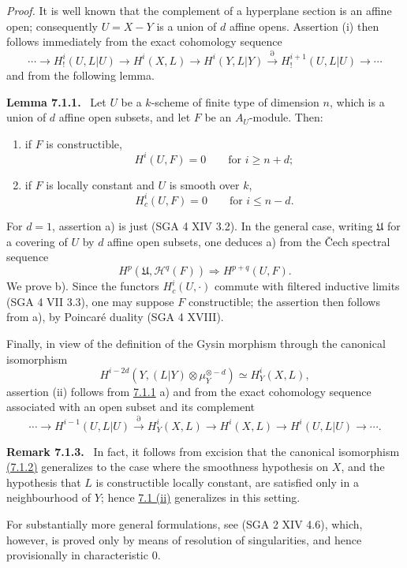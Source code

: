 \documentclass[11pt]{article}
\newenvironment{statement}[1]{\par\medskip\noindent\textbf{#1.}\ }{\par\medskip}
\begin{document}
\emph{Proof.} It is well known that the complement of a hyperplane section is an affine open; consequently $U=X-Y$ is a union of $d$ affine opens. Assertion (i) then follows immediately from the exact cohomology sequence
\[
\cdots\to H_!^i(U,L|U)\to H^i(X,L)\to H^i(Y,L|Y)
\xrightarrow{\partial} H_!^{i+1}(U,L|U)\to\cdots
\]
and from the following lemma.

\label{sga5:VII:lemma:7.1.1}\begin{statement}{Lemma 7.1.1}
Let $U$ be a $k$-scheme of finite type of dimension $n$, which is a union of $d$ affine open subsets, and let $F$ be an $A_U$-module. Then:
\begin{enumerate}[label=\alph*)]
\item if $F$ is constructible,
\[
H^i(U,F)=0\qquad\text{for }i\ge n+d;
\]
\item if $F$ is locally constant and $U$ is smooth over $k$,
\[
H^i_c(U,F)=0\qquad\text{for }i\le n-d.
\]
\end{enumerate}
\end{statement}

For $d=1$, assertion a) is just (SGA 4 XIV 3.2). In the general case, writing $\mathfrak U$ for a covering of $U$ by $d$ affine open subsets, one deduces a) from the Čech spectral sequence
\[
H^p(\mathfrak U,\mathcal H^q(F))\Rightarrow H^{p+q}(U,F).
\]
We prove b). Since the functors $H_c^i(U,\cdot)$ commute with filtered inductive limits (SGA 4 VII 3.3), one may suppose $F$ constructible; the assertion then follows from a), by Poincaré duality (SGA 4 XVIII).

Finally, in view of the definition of the Gysin morphism through the canonical isomorphism
\[
H^{i-2d}(Y,(L|Y)\otimes\mu_Y^{\otimes -d})\simeq H^i_Y(X,L),
\tag{7.1.2}\label{sga5:VII:equation:7.1.2}
\]
assertion (ii) follows from \hyperref[sga5:VII:lemma:7.1.1]{7.1.1} a) and from the exact cohomology sequence associated with an open subset and its complement
\[
\cdots\to H^{i-1}(U,L|U)\xrightarrow{\partial}H^i_Y(X,L)\to H^i(X,L)\to H^i(U,L|U)\to\cdots .
\]

\label{sga5:VII:remark:7.1.3}\begin{statement}{Remark 7.1.3}
In fact, it follows from excision that the canonical isomorphism \hyperref[sga5:VII:equation:7.1.2]{(7.1.2)} generalizes to the case where the smoothness hypothesis on $X$, and the hypothesis that $L$ is constructible locally constant, are satisfied only in a neighbourhood of $Y$; hence \hyperref[sga5:VII:theorem:7.1]{7.1 (ii)} generalizes in this setting.

For substantially more general formulations, see (SGA 2 XIV 4.6), which, however, is proved only by means of resolution of singularities, and hence provisionally in characteristic $0$.
\end{statement}
\end{document}
